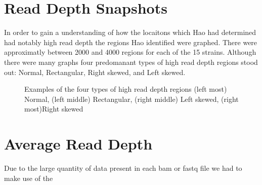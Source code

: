 \documentclass[12pt]{article}
\begin{document}
\section{Read Depth Snapshots}
	In order to gain a understanding of how the locaitons which Hao had determined had notably high read depth the regions Hao identified were graphed. There were approximatly between 2000 and 4000 regions for each of the 15 strains. Although there were many graphs four predomanant types of high read depth regions stood out: Normal, Rectangular, Right skewed, and Left skewed.
\begin{figure}[H]
	\begin{centering}
		\begin{singlespace}
			\vspace{-0.5cm}
			\caption[Examples of the four types of high read depth regions.]{Examples of the four types of high read depth regions (left most) Normal, (left middle) Rectangular, (right middle) Left skewed, (right most)Right skewed}\label{four_rds}
		\end{singlespace}
	\end{centering}
\end{figure}

%
%
\section{Average Read Depth}
	Due to the large quantity of data present in each bam or fastq file we had to make use of the 
%
%
\end{document}
